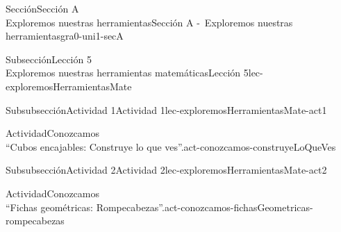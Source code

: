 \begin{sectionptx}{Sección}{{\Large Sección A\\}Exploremos nuestras herramientas}{}{Sección A -~Exploremos nuestras herramientas}{}{}{gra0-uni1-secA}
\begin{subsectionptx}{Subsección}{{\normalsize Lección 5\\[-0.05cm]}Exploremos nuestras herramientas matemáticas}{}{Lección 5}{}{}{lec-exploremosHerramientasMate}
\begin{subsubsectionptx}{Subsubsección}{Actividad 1}{}{Actividad 1}{}{}{lec-exploremosHerramientasMate-act1}
\begin{activity}{Actividad}{Conozcamos\\“Cubos encajables: Construye lo que ves”.}{act-conozcamos-construyeLoQueVes}%
%
\end{activity}%
\end{subsubsectionptx}
%
%
\typeout{************************************************}
\typeout{************************************************}
%
\begin{subsubsectionptx}{Subsubsección}{Actividad 2}{}{Actividad 2}{}{}{lec-exploremosHerramientasMate-act2}
\begin{activity}{Actividad}{Conozcamos\\“Fichas geométricas: Rompecabezas”.}{act-conozcamos-fichasGeometricas-rompecabezas}%
\begin{image}{0}{1}{0}{}%

\end{image}
\end{activity}
\end{subsubsectionptx}
\end{subsectionptx}
\end{sectionptx}
